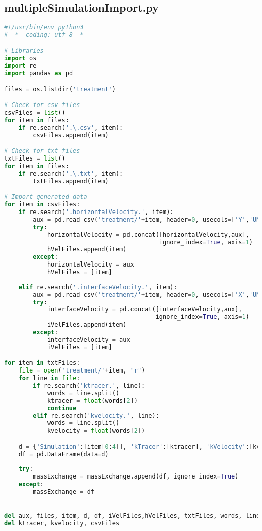 \documentclass[../main.tex]{subfiles}
\begin{document}
\subsection{multipleSimulationImport.py}
\begin{lstlisting}[language=python]
#!/usr/bin/env python3
# -*- coding: utf-8 -*-

# Libraries
import os
import re
import pandas as pd

files = os.listdir('treatment')

# Check for csv files
csvFiles = list()
for item in files:
    if re.search('.\.csv', item):
        csvFiles.append(item)

# Check for txt files
txtFiles = list()
for item in files:
    if re.search('.\.txt', item):
        txtFiles.append(item)

# Import generated data
for item in csvFiles:
    if re.search('.horizontalVelocity.', item):
        aux = pd.read_csv('treatment/'+item, header=0, usecols=['Y','UMean'])
        try:
            horizontalVelocity = pd.concat([horizontalVelocity,aux],
                                           ignore_index=True, axis=1)
            hVelFiles.append(item)
        except:
            horizontalVelocity = aux
            hVelFiles = [item]
            
    elif re.search('.interfaceVelocity.', item):
        aux = pd.read_csv('treatment/'+item, header=0, usecols=['X','UMean'])
        try:
            interfaceVelocity = pd.concat([interfaceVelocity,aux],
                                          ignore_index=True, axis=1)
            iVelFiles.append(item)
        except:
            interfaceVelocity = aux
            iVelFiles = [item]

for item in txtFiles:
    file = open('treatment/'+item, "r")
    for line in file:
        if re.search('ktracer.', line):
            words = line.split()
            ktracer = float(words[2])
            continue
        elif re.search('kvelocity.', line):
            words = line.split()
            kvelocity = float(words[2])

    d = {'Simulation':[item[0:4]], 'kTracer':[ktracer], 'kVelocity':[kvelocity]}
    df = pd.DataFrame(data=d)
    
    try:
        massExchange = massExchange.append(df, ignore_index=True)
    except:
        massExchange = df


del aux, files, item, d, df, iVelFiles,hVelFiles, txtFiles, words, line, file
del ktracer, kvelocity, csvFiles
\end{lstlisting}
\end{document}
